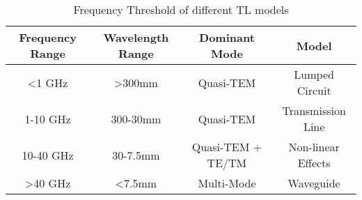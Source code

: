 \begin{table}
\caption{Frequency Threshold of different TL models}
\label{tab:model-threshold}
\begin{tabular}{c|c|c|c}
\toprule
Frequency Range & Wavelength Range & Dominant Mode & Model \\
\midrule
\hline
<1 GHz & >300mm & Quasi-TEM & Lumped Circuit \\
1-10 GHz & 300-30mm & Quasi-TEM & Transmission Line \\
10-40 GHz & 30-7.5mm & Quasi-TEM + TE/TM & Non-linear Effects \\
>40 GHz & <7.5mm & Multi-Mode & Waveguide \\
\bottomrule
\end{tabular}
\end{table}